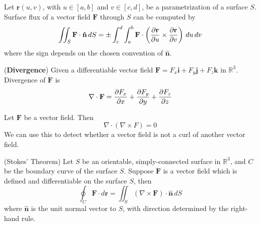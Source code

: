 \documentclass{huhtakm-template-book}
\begin{document}
\begin{thm}
    Let $\mathbf{r}(u,v)$, with $u\in[a,b]$ and $v\in[c,d]$, be a parametrization of a surface $S$. Surface flux of a vector field $\mathbf{F}$ through $S$ can be computed by
    \begin{equation*}
        \iint_{S}\mathbf{F}\cdot\mathbf{\hat{n}}\,dS=\pm\int_{c}^{d}\int_{a}^{b}\mathbf{F}\cdot\left(\pdv{\mathbf{r}}{u}\times\pdv{\mathbf{r}}{v}\right)\,du\,dv
    \end{equation*}
    where the sign depends on the chosen convention of $\mathbf{\hat{n}}$.
\end{thm}
\begin{defn}(\textbf{Divergence})
    Given a differentiable vector field $\mathbf{F}=F_{x}\mathbf{i}+F_{y}\mathbf{j}+F_{z}\mathbf{k}$ in $\mathbb{R}^{3}$. Divergence of $\mathbf{F}$ is
    \begin{equation*}
        \nabla\cdot\mathbf{F}=\pdv{F_{x}}{x}+\pdv{F_{y}}{y}+\pdv{F_{z}}{z}
    \end{equation*}
\end{defn}
\begin{thm}
    Let $\mathbf{F}$ be a vector field. Then
    \begin{equation*}
        \nabla\cdot(\nabla\times F)=0
    \end{equation*}
    We can use this to detect whether a vector field is not a curl of another vector field.
\end{thm}
\begin{thm}(Stokes' Theorem)
    Let $S$ be an orientable, simply-connected surface in $\mathbb{R}^{3}$, and $C$ be the boundary curve of the surface $S$. Suppose $\mathbf{F}$ is a vector field which is defined and differentiable on the surface $S$, then
    \begin{equation*}
        \oint_{C}\mathbf{F}\cdot d\mathbf{r}=\iint_{S}(\nabla\times\mathbf{F})\cdot\mathbf{\hat{n}}\,dS
    \end{equation*}
    where $\mathbf{\hat{n}}$ is the unit normal vector to $S$, with direction determined by the right-hand rule.
\end{thm}
\end{document}
